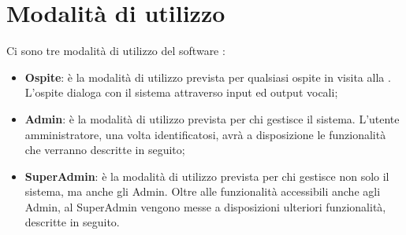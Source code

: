 \documentclass[../ManualeUtente_v2.0.0.tex]{subfiles}
\begin{document}
\section{Modalità di utilizzo}

	Ci sono tre modalità di utilizzo del software \atavi:
	\begin{itemize}
		\item{\textbf{Ospite}: è la modalità di utilizzo prevista per qualsiasi ospite in visita alla \prop. L'ospite dialoga con il sistema attraverso input ed output vocali;}
		\item{\textbf{Admin}: è la modalità di utilizzo prevista per chi gestisce il sistema. L'utente amministratore, una volta identificatosi, avrà a disposizione le funzionalità che verranno descritte in seguito;}
		\item{\textbf{SuperAdmin}: è la modalità di utilizzo prevista per chi gestisce non solo il sistema, ma anche gli Admin. Oltre alle funzionalità accessibili anche agli Admin, al SuperAdmin vengono messe a disposizioni ulteriori funzionalità, descritte in seguito.}
	\end{itemize}
	
\end{document}
